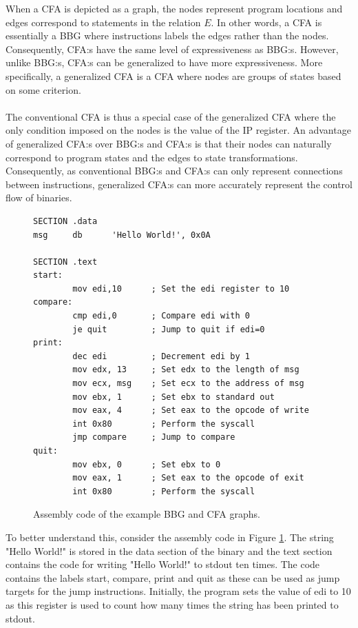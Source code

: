 \documentclass{kththesis}
\begin{document}
\clearpage
\noindent
When a CFA is depicted as a graph, the nodes represent program locations and edges correspond to statements in the relation $E$. In other words, a CFA is essentially a BBG where instructions labels the edges rather than the nodes. Consequently, CFA:s have the same level of expressiveness as BBG:s. However, unlike BBG:s, CFA:s can be generalized to have more expressiveness. More specifically, a generalized CFA is a CFA where nodes are groups of states based on some criterion. 
\\ \\
The conventional CFA is thus a special case of the generalized CFA where the only condition imposed on the nodes is the value of the IP register. An advantage of generalized CFA:s over BBG:s and CFA:s is that their nodes can naturally correspond to program states and the edges to state transformations. Consequently, as conventional BBG:s and CFA:s can only represent connections between instructions, generalized CFA:s can more accurately represent the control flow of binaries.
\begin{figure}[!t]
    \centering
\begin{tcolorbox}
\begin{verbatim}
SECTION .data
msg     db      'Hello World!', 0x0A

SECTION .text
start:
        mov edi,10      ; Set the edi register to 10
compare:
        cmp edi,0       ; Compare edi with 0
        je quit         ; Jump to quit if edi=0
print:
        dec edi         ; Decrement edi by 1
        mov edx, 13     ; Set edx to the length of msg
        mov ecx, msg    ; Set ecx to the address of msg
        mov ebx, 1      ; Set ebx to standard out
        mov eax, 4      ; Set eax to the opcode of write
        int 0x80        ; Perform the syscall
        jmp compare     ; Jump to compare
quit:
        mov ebx, 0      ; Set ebx to 0
        mov eax, 1      ; Set eax to the opcode of exit
        int 0x80        ; Perform the syscall
\end{verbatim}
\end{tcolorbox}
\caption[Assembly code of the example BBG and CFA graphs.]{Assembly code of the example BBG and CFA graphs.}
    \label{fig:assembly}
\end{figure}
\clearpage
\noindent
To better understand this, consider the assembly code in Figure \ref{fig:assembly}. The string "Hello World!" is stored in the data section of the binary and the text section contains the code for writing "Hello World!" to stdout ten times. The code contains the labels start, compare, print and quit as these can be used as jump targets for the jump instructions. Initially, the program sets the value of edi to 10 as this register is used to count how many times the string has been printed to stdout.
\end{document}
